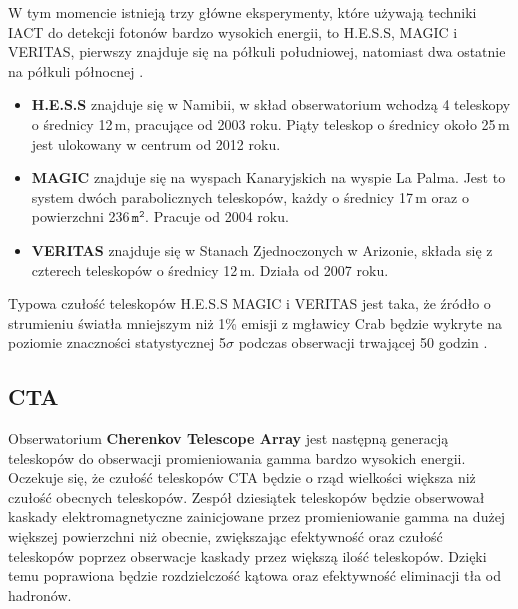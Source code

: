 \documentclass[a4paper,11pt,twoside]{article}
\begin{document}
W tym momencie istnieją trzy główne eksperymenty, które używają techniki IACT do detekcji fotonów bardzo wysokich energii, to H.E.S.S, MAGIC i VERITAS, pierwszy znajduje się na półkuli południowej, natomiast dwa ostatnie na półkuli północnej \cite{particle_de_angelis}. 
\begin{itemize}
\item {\bf{H.E.S.S}} \cite{hess} znajduje się w Namibii, w skład obserwatorium wchodzą 4 teleskopy o średnicy 12\,m, pracujące od 2003 roku. Piąty teleskop o średnicy około 25\,m jest ulokowany w centrum od 2012 roku.
\item {\bf{MAGIC}} \cite{magic} znajduje się na wyspach Kanaryjskich na wyspie La Palma. Jest to system dwóch parabolicznych teleskopów, każdy o średnicy 17\,m oraz o powierzchni 236\,$\mathtt{m^2}$. Pracuje od 2004 roku.
\item {\bf{VERITAS}} \cite{veritas} znajduje się w Stanach Zjednoczonych w Arizonie, składa się z czterech teleskopów o średnicy 12\,m. Działa od 2007 roku.
\end{itemize}
Typowa czułość teleskopów H.E.S.S MAGIC i VERITAS jest taka, że źródło o  strumieniu światła mniejszym niż 1\% emisji z mgławicy Crab będzie wykryte na poziomie znaczności statystycznej 5$\sigma$ podczas obserwacji trwającej 50 godzin \cite{particle_de_angelis}. 
\newpage
\subsection{CTA}
Obserwatorium {\bf{Cherenkov Telescope Array}} jest następną generacją teleskopów do obserwacji promieniowania gamma bardzo wysokich energii. Oczekuje się, że czułość teleskopów CTA będzie o rząd wielkości większa niż czułość obecnych teleskopów. 
Zespół dziesiątek teleskopów będzie obserwował kaskady elektromagnetyczne zainicjowane przez promieniowanie gamma na dużej większej powierzchni niż obecnie, zwiększając efektywność oraz czułość teleskopów poprzez obserwacje kaskady przez większą ilość teleskopów. Dzięki temu poprawiona będzie rozdzielczość kątowa oraz efektywność eliminacji tła od hadronów.
\end{document}

